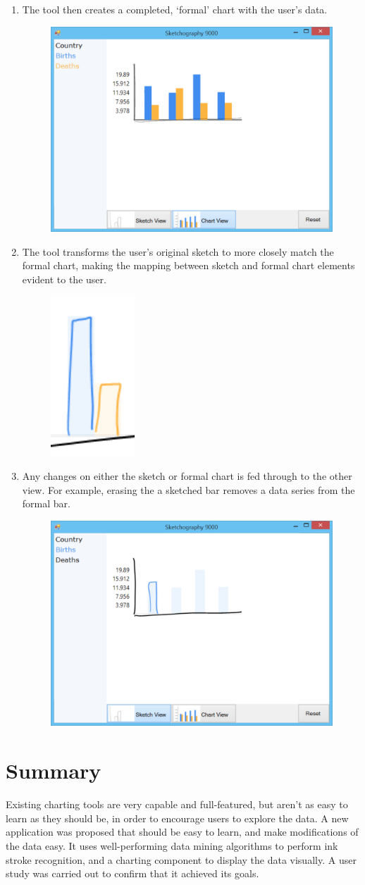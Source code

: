 \begin{enumerate}
\begin{figure}[H]
	\end{figure}
\item The tool then creates a completed, `formal' chart with the user's data.
	\begin{figure}[H]
	\centering
	\includegraphics[width=0.6\linewidth]{walk4}
	\end{figure}
\item The tool transforms the user's original sketch to more closely match the formal chart, making the mapping between sketch and formal chart elements evident to the user.
	\begin{figure}[H]
	\centering
	\includegraphics[width=0.1\linewidth]{walk5}
	\end{figure}
\item Any changes on either the sketch or formal chart is fed through to the other view. For example, erasing the a sketched bar removes a data series from the formal bar.
	\begin{figure}[H]
	\centering
	\includegraphics[width=0.6\linewidth]{walk6}
	\end{figure}
\end{enumerate}

\section{Summary}
Existing charting tools are very capable and full-featured, but aren't as easy to learn as they should be, in order to encourage users to explore the data. A new application was proposed that should be easy to learn, and make modifications of the data easy. It uses well-performing data mining algorithms to perform ink stroke recognition, and a charting component to display the data visually. A user study was carried out to confirm that it achieved its goals.
